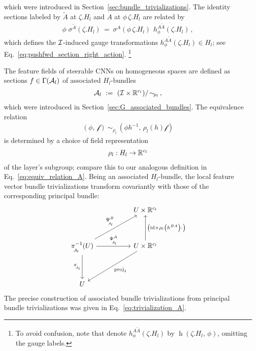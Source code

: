 which were introduced in Section~\ref{sec:bundle_trivializations}.
The identity sections labeled by $\widetilde{A}$ at $\zeta.H_l$ and $A$ at $\phi\,\zeta.H_l$ are related by
\begin{align}\label{eq:homogeneous_induce_gauge_trafo}
    \phi\; \sigma^{\widetilde{A}} (\zeta.H_l) \ =\ \sigma^A (\phi\,\zeta.H_l)\,\ h_\phi^{A\widetilde{A}} (\zeta.H_l) \,,
\end{align}
which defines the $\mathcal{I}$-induced gauge transformations $h_\phi^{A\widetilde{A}} (\zeta.H_l) \in H_l$; see Eq.~\eqref{eq:pushfwd_section_right_action}.%
\footnote{
    To avoid confusion, note that \citet{Cohen2018-intertwiners}\cite{Cohen2019-generaltheory} denote $h_\phi^{A\widetilde{A}} (\zeta.H_l)$ by $\operatorname{h} (\zeta.H_l,\, \phi)$, omitting the gauge labels.
}




The feature fields of steerable CNNs on homogeneous spaces are defined as sections $f\in \Gamma(\mathcal{A}_l)$ of associated $H_l$-bundles
\begin{align}\label{eq:equiv_rel_rhol}
    \mathcal{A}_l\ :=\ (\mathcal{I}\times\mathbb{R}^{c_l})/\!\sim_{\!\rho_l} \,,
\end{align}
which were introduced in Section~\ref{sec:G_associated_bundles}.
The equivalence relation
\begin{align}
    (\phi,\, \mathscr{f})\ \sim_{\!\rho_l}\, (\phi h^{-1},\, \rho_l(h) \mathscr{f})
\end{align}
is determined by a choice of field representation
\begin{align}
    \rho_l: H_l \to \mathbb{R}^{c_l}
\end{align}
of the layer's subgroup; compare this to our analogous definition in Eq.~\eqref{eq:equiv_relation_A}.
Being an associated $H_l$-bundle, the local feature vector bundle trivializations transform covariantly with those of the corresponding principal bundle:
\begin{equation}
\begin{tikzcd}[row sep=3.5em, column sep=5.em]
    & U\times \R^{c_l}
    \\
      \piAl^{-1}(U)  \arrow[d, swap, "\piAl"]
                    \arrow[r, "\PsiAl^A"]
                    \arrow[ru, "\PsiAl^B"]
    & U\times \R^ {c_l} \arrow[u, swap, "\big(\id\times \rho_l\big(h^{BA}\big)\cdot\big)"]
                    \arrow[ld, "\proj_1"]
    \\
    U
\end{tikzcd}
\end{equation}
The precise construction of associated bundle trivializations from principal bundle trivializations was given in Eq.~\eqref{eq:trivialization_A}.


